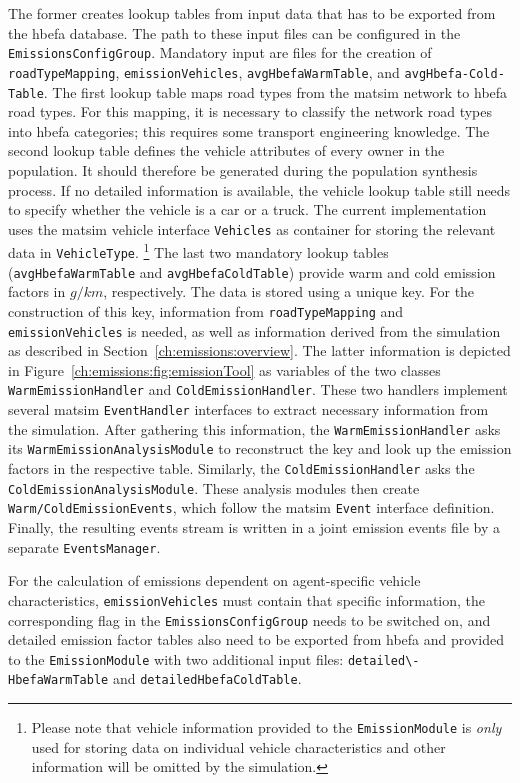 The former creates lookup tables from input data that has to be exported from the \gls{hbefa} database. The path to these input files can be configured in the \lstinline|EmissionsConfigGroup|. Mandatory input are files for the creation of \lstinline|roadTypeMapping|, \lstinline|emissionVehicles|, \lstinline|avgHbefaWarmTable|, and \lstinline|avgHbefa-Cold-Table|.
%
The first lookup table maps road types from the \gls{matsim} network to \gls{hbefa} road types. For this mapping, it is necessary to classify the network road types into \gls{hbefa} categories; this requires some transport engineering knowledge.
%
The second lookup table defines the vehicle attributes of every owner in the population. It should therefore be generated during the population synthesis process. If no detailed information is available, the vehicle lookup table still needs to specify whether the vehicle is a car or a truck. The current implementation uses the \gls{matsim} vehicle interface 
\lstinline|Vehicles| as container for storing the relevant data in \lstinline|VehicleType|.%
%
\footnote{
%
Please note that vehicle information provided to the \lstinline|EmissionModule| is \emph{only} used for storing data on individual vehicle characteristics and other information will be omitted by the simulation.
%
}
%
The last two mandatory lookup tables (\lstinline|avgHbefaWarmTable| and \lstinline|avgHbefaColdTable|) provide warm and cold emission factors in $g/km$, respectively. The data is stored using a unique key. For the construction of this key, information from \lstinline|roadTypeMapping| and \lstinline|emissionVehicles| is needed, as well as information derived from the simulation as described in Section~\ref{ch:emissions:overview}.
%
The latter information is depicted in Figure~\ref{ch:emissions:fig:emissionTool} as variables of the two classes \lstinline|WarmEmissionHandler| and \lstinline|ColdEmissionHandler|. These two handlers implement several \gls{matsim} \lstinline|EventHandler| interfaces to extract necessary information from the simulation. After gathering this information, the \lstinline|WarmEmissionHandler| asks its \lstinline|WarmEmissionAnalysisModule| to reconstruct the key and look up the emission factors in the respective table. Similarly, the \lstinline|ColdEmissionHandler| asks the \lstinline|ColdEmissionAnalysisModule|. These analysis modules then create \lstinline|Warm/ColdEmissionEvents|, which follow the \gls{matsim} \lstinline|Event| interface definition. Finally, the resulting events stream is written in a joint emission events file by a separate \lstinline|EventsManager|.

For the calculation of emissions dependent on agent-specific vehicle characteristics, \lstinline|emissionVehicles| must contain that specific information, the corresponding flag in the \lstinline|EmissionsConfigGroup| needs to be switched on, and detailed emission factor tables also need to be exported from \gls{hbefa} and provided to the \lstinline|EmissionModule| with two additional input files: \lstinline|detailed\-HbefaWarmTable| and \lstinline|detailedHbefaColdTable|.

